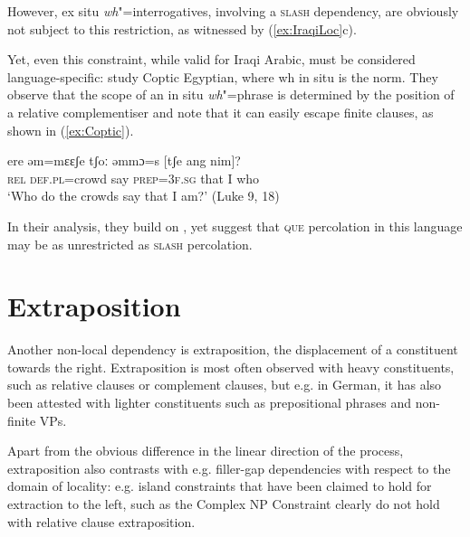 \documentclass[output=paper
                ,modfonts
                ,nonflat
	        ,collection
	        ,collectionchapter
	        ,collectiontoclongg
 	        ,biblatex
                ,babelshorthands
                ,newtxmath
                ,draftmode
                ,colorlinks, citecolor=brown
]{./langsci/langscibook}
\begin{document}
{\begin{exe}
\end{exe}

\noindent
However, ex situ \emph{wh}"=interrogatives, involving a \textsc{slash} dependency, are obviously not subject to this restriction, as witnessed by (\ref{ex:IraqiLoc}c).  

Yet, even this constraint, while valid for Iraqi Arabic, must be considered language-specific: \citet{Crysmann:Reintges:14} study Coptic Egyptian, where wh in situ is the norm. They observe that the scope of an in situ \emph{wh}"=phrase is determined by the position of a relative complementiser and note that it can easily escape finite clauses, as shown in (\ref{ex:Coptic}). 

\begin{exe}
  \ex \gll ere əm=mɛɛʃe tʃoː əmmɔ=s [tʃe ang nim]?\\
  \textsc{rel} \textsc{def.pl}=crowd say \textsc{prep=3f.sg} \spacebr{}that I who\\
  \glt `Who do the crowds say that I am?'  (Luke 9, 18) \label{ex:Coptic}
\end{exe}

\noindent
In their analysis, they build on \citet{Johnson:Lappin:97}, yet suggest that \textsc{que} percolation in this language may be as unrestricted as \textsc{slash} percolation.


\section{Extraposition}

Another non-local dependency is extraposition, the displacement of a
constituent towards the right. Extraposition is most often observed
with heavy constituents, such as relative clauses or complement
clauses, but e.g. in German, it has also been attested with lighter
constituents such as prepositional phrases and non-finite VPs. %

Apart from the obvious difference in the linear direction of the
process, extraposition also contrasts with e.g. filler-gap
dependencies with respect to the domain of locality: e.g. island
constraints that have been claimed to hold for extraction to the left,
such as the Complex NP Constraint \citep{ross_j67} clearly do not hold with relative clause
extraposition.

}
\end{document}
